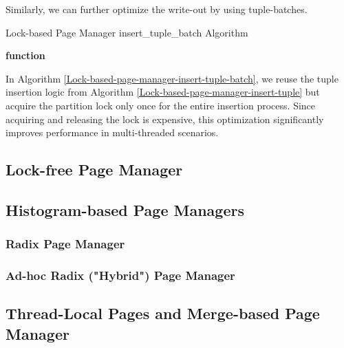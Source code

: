 Similarly, we can further optimize the write-out by using tuple-batches.
\begin{algorithm}
\caption{Lock-based Page Manager insert\_tuple\_batch Algorithm}\label{Lock-based-page-manager-insert-tuple-batch}


\textbf{function}
\end{algorithm}
In Algorithm \ref{Lock-based-page-manager-insert-tuple-batch}, we reuse the tuple insertion logic from Algorithm \ref{Lock-based-page-manager-insert-tuple} but acquire the partition lock only once for the entire insertion process.
Since acquiring and releasing the lock is expensive, this optimization significantly improves performance in multi-threaded scenarios.

\subsection{Lock-free Page Manager}

\subsection{Histogram-based Page Managers}
\subsubsection{Radix Page Manager}
\subsubsection{Ad-hoc Radix ("Hybrid") Page Manager}

\subsection{Thread-Local Pages and Merge-based Page Manager}

